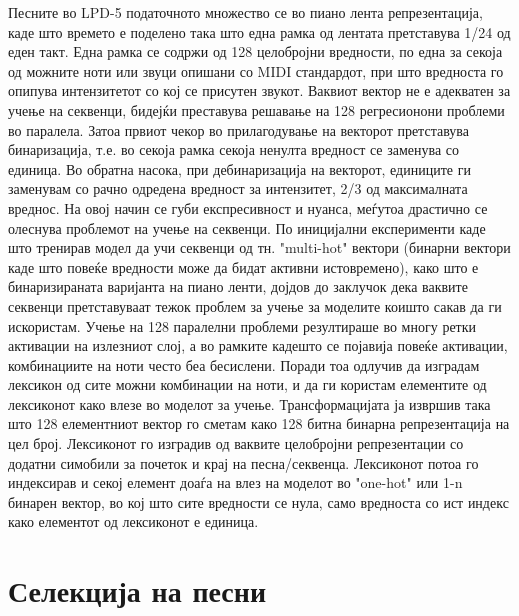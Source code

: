 Песните во LPD-5 податочното множество се во пиано лента репрезентација, каде што времето е поделено така што една рамка од лентата претставува 1/24 од еден такт. Една рамка се содржи од 128 целобројни вредности, по една за секоја од можните ноти или звуци опишани со MIDI стандардот, при што вредноста го опипува интензитетот со кој се присутен звукот. Ваквиот вектор не е адекватен за учење на секвенци, бидејќи преставува решавање на 128 регресионони проблеми во паралела. Затоа првиот чекор во прилагодување на векторот претставува бинаризација, т.е. во секоја рамка секоја ненулта вредност се заменува со единица. Во обратна насока, при дебинаризација на векторот, единиците ги заменувам со рачно одредена вредност за интензитет, 2/3 од максималната вреднос. На овој начин се губи експресивност и нуанса, меѓутоа драстично се олеснува проблемот на учење на секвенци. 
По иницијални експерименти каде што тренирав модел да учи секвенци од тн. "multi-hot" вектори (бинарни вектори каде што повеќе вредности може да бидат активни истовремено), како што е бинаризираната варијанта на пиано ленти, дојдов до заклучок дека ваквите секвенци претставуваат тежок проблем за учење за моделите коишто сакав да ги искористам. Учење на 128 паралелни проблеми резултираше во многу ретки активации на излезниот слој, а во рамките кадешто се појавија повеќе активации, комбинациите на ноти често беа бесислени. Поради тоа одлучив да изградам лексикон од сите можни комбинации на ноти, и да ги користам елементите од лексиконот како влезе во моделот за учење. Трансформацијата ја извршив така што 128 елементниот вектор го сметам како 128 битна бинарна репрезентација на цел број. Лексиконот го изградив од ваквите целобројни репрезентации со додатни симобили за почеток и крај на песна/секвенца. Лексиконот потоа го индексирав и секој елемент доаѓа на влез на моделот во "one-hot" или 1-n бинарен вектор, во кој што сите вредности се нула, само вредноста со ист индекс како елементот од лексиконот е единица.

\section{Селекција на песни}

